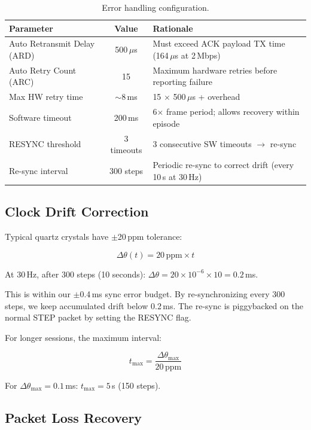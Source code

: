 \documentclass[11pt,a4paper]{article}
\begin{document}
\begin{table}[htbp]
\centering
\caption{Error handling configuration.}
\begin{tabular}{l c l}
\toprule
\textbf{Parameter} & \textbf{Value} & \textbf{Rationale} \\
\midrule
Auto Retransmit Delay (ARD) & 500\,$\mu$s & Must exceed ACK payload TX time (164\,$\mu$s at 2\,Mbps) \\
Auto Retry Count (ARC) & 15 & Maximum hardware retries before reporting failure \\
Max HW retry time & ${\sim}$8\,ms & 15 $\times$ 500\,$\mu$s + overhead \\
Software timeout & 200\,ms & 6$\times$ frame period; allows recovery within episode \\
RESYNC threshold & 3 timeouts & 3 consecutive SW timeouts $\to$ re-sync \\
Re-sync interval & 300 steps & Periodic re-sync to correct drift (every 10\,s at 30\,Hz) \\
\bottomrule
\end{tabular}
\label{tab:retry-config}
\end{table}

\subsection{Clock Drift Correction}

Typical quartz crystals have $\pm$20\,ppm tolerance:

\begin{equation}
\Delta\theta(t) = 20\,\text{ppm} \times t
\end{equation}

At 30\,Hz, after 300 steps (10 seconds): $\Delta\theta = 20 \times 10^{-6} \times 10 = 0.2$\,ms.

This is within our $\pm$0.4\,ms sync error budget. By re-synchronizing every 300 steps, we keep accumulated drift below 0.2\,ms. The re-sync is piggybacked on the normal STEP packet by setting the RESYNC flag.

For longer sessions, the maximum interval:

\begin{equation}
t_{\max} = \frac{\Delta\theta_{\max}}{20\,\text{ppm}}
\end{equation}

For $\Delta\theta_{\max} = 0.1$\,ms: $t_{\max} = 5$\,s (150 steps).

\subsection{Packet Loss Recovery}
\end{document}
